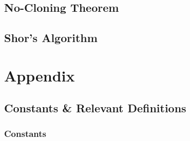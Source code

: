 \documentclass[colorlinks,11pt,a4paper,normalphoto,withhyper,ragged2e]{altareport}
\begin{document}
	\subsection{No-Cloning Theorem}
	
	\subsection{Shor's Algorithm}
	
	
	
		
\section{Appendix}
	
	\subsection{Constants \& Relevant Definitions}
		
		\subsubsection{Constants}
		
\end{document}
